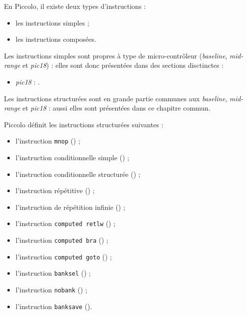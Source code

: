 
\cleardoublepage


\thispagestyle{empty}

En Piccolo, il existe deux types d'instructions :
\begin{itemize}
  \item les instructions simples ;
  \item les instructions composées.
\end{itemize}

Les instructions simples sont propres à type de micro-contrôleur (\emph{baseline}, \emph{mid-range} et \emph{pic18}) : elles sont donc présentées dans des sections disctinctes :
\begin{itemize}
  \item \emph{pic18} : .
\end{itemize}


Les instructions structurées sont en grande partie communes aux \emph{baseline}, \emph{mid-range} et \emph{pic18} : aussi elles sont présentées dans ce chapitre commun.

Piccolo définit les instructions structurées suivantes :
\begin{itemize}
  \item l'instruction \texttt{mnop} () ;
  \item l'instruction conditionnelle simple () ;
  \item l'instruction conditionnelle structurée () ;
  \item l'instruction répétitive () ;
  \item l'instruction de répétition infinie () ;
  \item l'instruction \texttt{computed retlw} () ;
  \item l'instruction \texttt{computed bra} () ;
  \item l'instruction \texttt{computed goto} () ;
  \item l'instruction \texttt{banksel} () ;

  \item l'instruction \texttt{nobank} () ;

  \item l'instruction \texttt{banksave} ().

\end{itemize}

